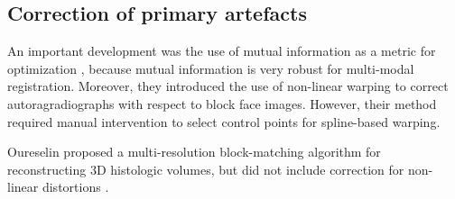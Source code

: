 \documentclass[12pt]{article}
\begin{document}
\subsection{Correction of primary artefacts}

An important development was the use of mutual information as a metric for optimization \cite{Kim1997}, because mutual information is very robust for multi-modal registration. Moreover, they introduced the use of non-linear warping to correct autoragradiographs with respect to block face images. However, their method required manual intervention to select control points for spline-based warping.

Oureselin proposed a multi-resolution block-matching algorithm for reconstructing 3D histologic volumes, but did not include correction for non-linear distortions \cite{Ourselin2001}.
\end{document}
